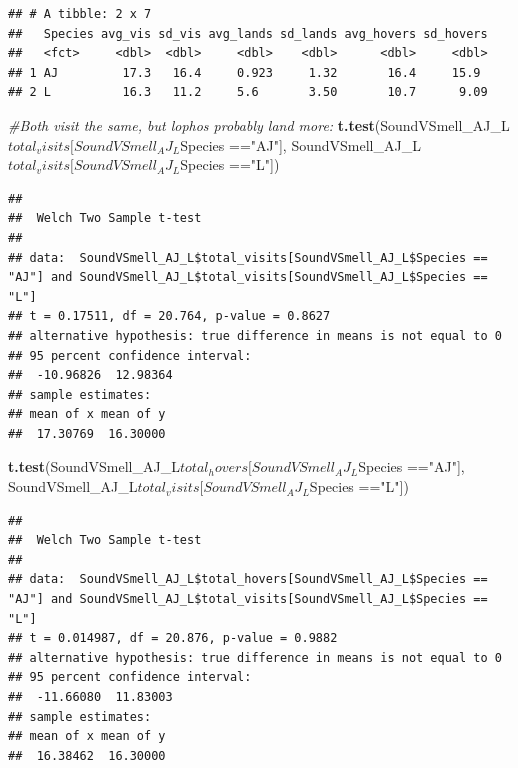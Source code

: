 \documentclass[]{article}
\newenvironment{Shaded}{\begin{snugshade}}{\end{snugshade}}
\newcommand{\KeywordTok}[1]{\textcolor[rgb]{0.13,0.29,0.53}{\textbf{{#1}}}}
\newcommand{\StringTok}[1]{\textcolor[rgb]{0.31,0.60,0.02}{{#1}}}
\newcommand{\CommentTok}[1]{\textcolor[rgb]{0.56,0.35,0.01}{\textit{{#1}}}}
\newcommand{\NormalTok}[1]{{#1}}
\begin{document}
\begin{verbatim}
## # A tibble: 2 x 7
##   Species avg_vis sd_vis avg_lands sd_lands avg_hovers sd_hovers
##   <fct>     <dbl>  <dbl>     <dbl>    <dbl>      <dbl>     <dbl>
## 1 AJ         17.3   16.4     0.923     1.32       16.4     15.9 
## 2 L          16.3   11.2     5.6       3.50       10.7      9.09
\end{verbatim}

\begin{Shaded}
\begin{Highlighting}[]
\CommentTok{#Both visit the same, but lophos probably land more: }
\KeywordTok{t.test}\NormalTok{(SoundVSmell_AJ_L$total_visits[SoundVSmell_AJ_L$Species ==}\StringTok{"AJ"}\NormalTok{], SoundVSmell_AJ_L$total_visits[SoundVSmell_AJ_L$Species ==}\StringTok{"L"}\NormalTok{])}
\end{Highlighting}
\end{Shaded}

\begin{verbatim}
## 
##  Welch Two Sample t-test
## 
## data:  SoundVSmell_AJ_L$total_visits[SoundVSmell_AJ_L$Species == "AJ"] and SoundVSmell_AJ_L$total_visits[SoundVSmell_AJ_L$Species == "L"]
## t = 0.17511, df = 20.764, p-value = 0.8627
## alternative hypothesis: true difference in means is not equal to 0
## 95 percent confidence interval:
##  -10.96826  12.98364
## sample estimates:
## mean of x mean of y 
##  17.30769  16.30000
\end{verbatim}

\begin{Shaded}
\begin{Highlighting}[]
\KeywordTok{t.test}\NormalTok{(SoundVSmell_AJ_L$total_hovers[SoundVSmell_AJ_L$Species ==}\StringTok{"AJ"}\NormalTok{], SoundVSmell_AJ_L$total_visits[SoundVSmell_AJ_L$Species ==}\StringTok{"L"}\NormalTok{])}
\end{Highlighting}
\end{Shaded}

\begin{verbatim}
## 
##  Welch Two Sample t-test
## 
## data:  SoundVSmell_AJ_L$total_hovers[SoundVSmell_AJ_L$Species == "AJ"] and SoundVSmell_AJ_L$total_visits[SoundVSmell_AJ_L$Species == "L"]
## t = 0.014987, df = 20.876, p-value = 0.9882
## alternative hypothesis: true difference in means is not equal to 0
## 95 percent confidence interval:
##  -11.66080  11.83003
## sample estimates:
## mean of x mean of y 
##  16.38462  16.30000
\end{verbatim}
\end{document}
